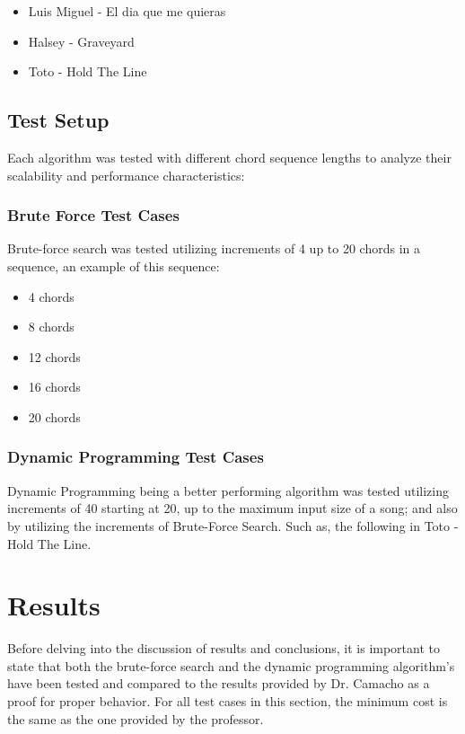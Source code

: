 \documentclass[conference]{IEEEtran}
\begin{document}
\begin{itemize}
    \item Luis Miguel - El dia que me quieras
    \item Halsey - Graveyard
    \item Toto - Hold The Line
\end{itemize}

\subsection{Test Setup}
Each algorithm was tested with different chord sequence lengths to analyze their scalability and performance characteristics:

\subsubsection{Brute Force Test Cases}
Brute-force search was tested utilizing increments of 4 up to 20 chords in a sequence, an example of this sequence:
\begin{itemize}
    \item 4 chords
    \item 8 chords
    \item 12 chords
    \item 16 chords
    \item 20 chords
\end{itemize}

\subsubsection{Dynamic Programming Test Cases}
Dynamic Programming being a better performing algorithm was tested utilizing increments of 40 starting at 20, up to the maximum input size of a song; and also by utilizing the increments of Brute-Force Search. Such as, the following in Toto - Hold The Line. 

\section{Results}
Before delving into the discussion of results and conclusions, it is important to state that both the brute-force search and the dynamic programming algorithm's have been tested and compared to the results provided by Dr. Camacho as a proof for proper behavior. For all test cases in this section, the minimum cost is the same as the one provided by the professor. 
\end{document}
